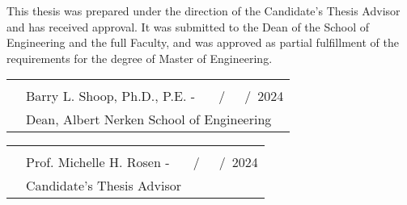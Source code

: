 \documentclass[12pt]{report}
\begin{document}
\normalsize{This thesis was prepared under the direction of the Candidate's Thesis Advisor and has received approval. It was submitted to the Dean of the School of Engineering and the full Faculty, and was approved as partial fulfillment of the requirements for the degree of Master of Engineering.}

\vspace{4cm}
\begin{flushright}
\begin{tabular}{@{}p{.5in}p{3.2in}@{}}
& \hrulefill \\
& Barry L. Shoop, Ph.D., P.E. - ~~~/~~~/~2024 \\
& Dean, Albert Nerken School of Engineering\\
\end{tabular}
\end{flushright}

\vspace{1.5cm}
\begin{flushleft}
\begin{tabular}{@{}p{0in}p{2.9in}@{}}
& \hrulefill \\
& Prof. Michelle H. Rosen -  ~~~/~~~/~2024 \\
& Candidate's Thesis Advisor\\
\end{tabular}
\end{flushleft}
\medskip
\clearpage




\tableofcontents
\listoffigures
\end{document}
